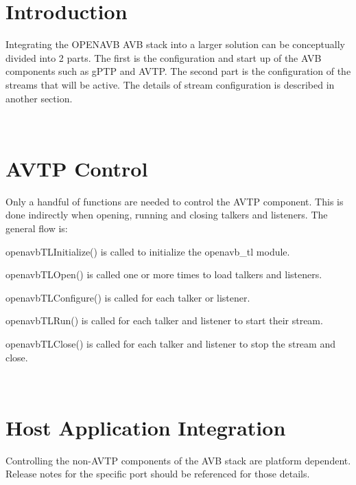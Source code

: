\hypertarget{sdk_integration_sdk_integration_introduction}{}\section{Introduction }\label{sdk_integration_sdk_integration_introduction}
Integrating the O\+P\+E\+N\+A\+VB A\+VB stack into a larger solution can be conceptually divided into 2 parts. The first is the configuration and start up of the A\+VB components such as g\+P\+TP and A\+V\+TP. The second part is the configuration of the streams that will be active. The details of stream configuration is described in another section.

~\newline
\hypertarget{sdk_integration_sdk_integration_avtp_control}{}\section{A\+V\+T\+P Control }\label{sdk_integration_sdk_integration_avtp_control}
Only a handful of functions are needed to control the A\+V\+TP component. This is done indirectly when opening, running and closing talkers and listeners. The general flow is\+:
\begin{DoxyEnumerate}
\item openavb\+T\+L\+Initialize() is called to initialize the openavb\+\_\+tl module.
\item openavb\+T\+L\+Open() is called one or more times to load talkers and listeners.
\item openavb\+T\+L\+Configure() is called for each talker or listener.
\item openavb\+T\+L\+Run() is called for each talker and listener to start their stream.
\item openavb\+T\+L\+Close() is called for each talker and listener to stop the stream and close.
\end{DoxyEnumerate}

~\newline
\hypertarget{sdk_integration_sdk_integration_host_app}{}\section{Host Application Integration }\label{sdk_integration_sdk_integration_host_app}
Controlling the non-\/\+A\+V\+TP components of the A\+VB stack are platform dependent. Release notes for the specific port should be referenced for those details. 